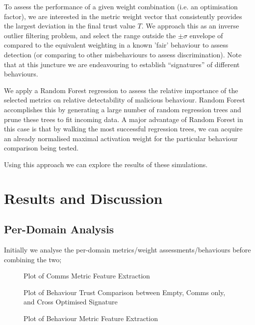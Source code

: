 \documentclass{aamas2016}
\begin{document}
To assess the performance of a given weight combination (i.e. an optimisation factor), we are interested in the metric weight vector that consistently provides the largest deviation in the final trust value $T$. We approach this as an inverse outlier filtering problem, and select the range outside the $\pm\sigma$ envelope of compared to the equivalent weighting in a known 'fair' behaviour to assess detection (or comparing to other misbehaviours to assess discrimination). Note that at this juncture we are endeavouring to establish ``signatures'' of different behaviours.

We apply a Random Forest regression \cite{Breiman2001} to assess the relative importance of the selected metrics on relative detectability of malicious behaviour. 
Random Forest accomplishes this by generating a large number of random regression trees and prune these trees to fit incoming data. A major advantage of Random Forest in this case is that by walking the most successful regression trees, we can acquire an already normalised maximal activation weight for the particular behaviour comparison being tested.

Using this approach we can explore the results of these simulations.

\section{Results and Discussion}

\subsection{Per-Domain Analysis}

Initially we analyse the per-domain metrics/weight assessments/behaviours before combining the two; 

\begin{figure}[h]
	\centering
	\caption{Plot of Comms Metric Feature Extraction}
	\label{fig:comms_feature_extraction}
\end{figure}

\begin{figure}[h]
	\centering
	\caption{Plot of Behaviour Trust Comparison between Empty, Comms only, and Cross Optimised Signature}
	\label{fig:comms_trust_signature}
\end{figure}

\begin{figure}[h]
	\centering
	\caption{Plot of Behaviour Metric Feature Extraction}
	\label{fig:comms_feature_extraction}
\end{figure}
\end{document}
